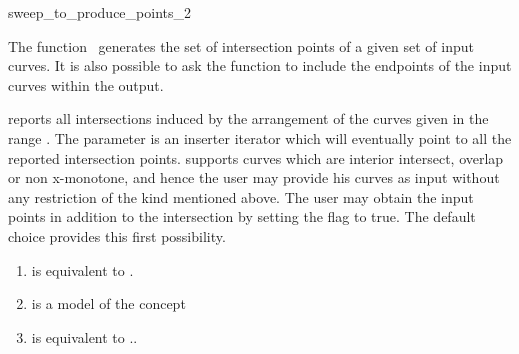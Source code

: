 

\begin{ccRefFunction}{sweep_to_produce_points_2}  %


\ccDefinition
  
The function \ccRefName\ generates the set of intersection points of a
given set of input curves. It is also possible to ask the function to
include the endpoints of the input curves within the output.


   {reports all intersections induced by the arrangement of the curves
   given in the range \ccStyle{[curves_begin, curves_end)}. The
   parameter  is an inserter iterator which 
   will eventually point to all the reported intersection points. 
    supports
   curves which are interior intersect, overlap or non x-monotone, and
   hence the user may provide his curves as input without any
   restriction of the kind mentioned above. 
   The user may obtain the input points in addition to the intersection 
   by setting the flag  to true. 
   The default choice provides this first possibility.}

\begin{enumerate}
   \item    {} is equivalent to .
   \item    {} is a model of the  concept
   \item    {} is equivalent to ..
\end{enumerate}



\end{ccRefFunction}
